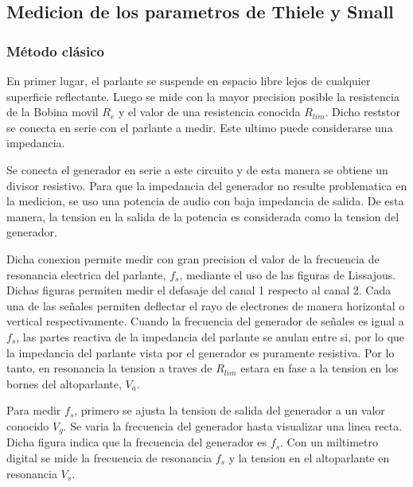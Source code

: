 \documentclass[]{article}
\makeatletter
\newcommand{\figura}[3]{
\vspace{0.2 cm}
\begin{figurehere}
\centering
\texttt{[image: \#1]}
\captionof{figure}{#2}
\label{#3}
\end{figurehere}
\vspace{0.2 cm}
}
\newenvironment{figurehere}   %
  {\def\@captype{figure}}   %
  {\par\medskip}
  {}              %
\makeatother
\begin{document}
\begin{multicols}{2}


\subsection{Medicion de los parametros de Thiele y Small}
\subsubsection{Método clásico}
En primer lugar, el parlante se  suspende en espacio libre lejos de cualquier superficie
reflectante. Luego se mide con la mayor precision posible la resistencia de la
Bobina movil $R_e$ y el valor de una resistencia conocida $R_{lim}$.
Dicho reststor se conecta en serie con el parlante a medir. Este ultimo puede
considerarse una impedancia.

Se conecta el generador en serie a este circuito y de esta manera se obtiene un
divisor resistivo. Para que la impedancia del generador no resulte problematica
en la medicion, se uso una potencia de audio con baja impedancia de salida. De
esta manera, la tension en la salida de la potencia es considerada como la
tension del generador.

Dicha conexion permite medir con gran precision el valor de la frecuencia
de resonancia electrica del parlante, $f_s$, mediante el uso de las figuras de
Lissajous. Dichas figuras permiten medir el defasaje del canal 1 respecto al
canal 2. Cada una de las señales permiten deflectar el rayo de electrones de
manera horizontal o vertical respectivamente. Cuando la frecuencia del generador
de señales es igual a $f_s$, las partes reactiva de la impedancia del parlante
se anulan entre si, por lo que la impedancia del parlante vista por el generador
es puramente resistiva. Por lo tanto, en resonancia la tension a traves de
$R_{lim}$ estara en fase a la tension en los bornes del altoparlante, $V_{a}$.



Para medir $f_s$, primero se ajusta la tension de salida del generador a un valor
conocido $V_g$. Se varia la frecuencia del generador hasta visualizar una linea
recta. Dicha figura indica que la frecuencia del generador
es $f_s$. Con un miltimetro digital se mide la frecuencia de resonancia
$f_s$ y la tension en el altoparlante en resonancia $V_s$.


\end{multicols}
\end{document}
